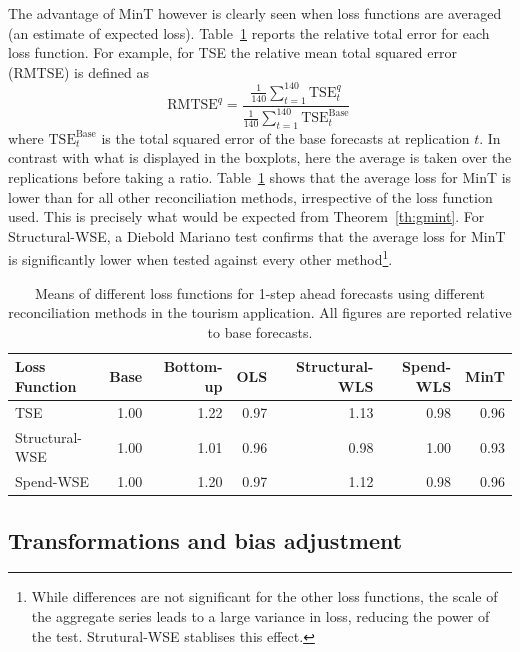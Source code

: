 \documentclass[12pt]{article}
\theoremstyle{definition}
\begin{document}
{\color{blue}

The advantage of MinT however is clearly seen when loss functions are averaged (an estimate of expected loss).  Table~\ref{tab:lossVmethods} reports the relative total error for each loss function. For example, for TSE the relative mean total squared error (RMTSE) is defined as
\begin{equation}
\textrm{RMTSE}^{q}=\frac{\frac{1}{140}\sum\limits_{t=1}^{140}\textrm{TSE}^{q}_t}{\frac{1}{140}\sum\limits_{t=1}^{140}\textrm{TSE}^{\textrm{Base}}_t}\,\label{eq:RTSE}
\end{equation}
where $\textrm{TSE}^{\textrm{Base}}_t$ is the total squared error of the base forecasts at replication $t$.  In contrast with what is displayed in the boxplots, here the average is taken over the replications before taking a ratio.  Table~\ref{tab:lossVmethods} shows that the average loss for MinT is lower than for all other reconciliation methods, irrespective of the loss function used.  This is precisely what would be expected from Theorem~\ref{th:gmint}. For Structural-WSE, a Diebold Mariano test confirms that the average loss for MinT is significantly lower when tested against every other method\footnote{{\color{blue} While differences are not significant for the other loss functions, the scale of the aggregate series leads to a large variance in loss, reducing the power of the test.  Strutural-WSE stablises this effect.}}.


\begin{table}[ht]
	\centering
{\color{blue}	
	\begin{tabular}{lrrrrrr}
		\hline
		Loss Function & Base & Bottom-up & OLS & Structural-WLS & Spend-WLS & MinT \\
		\hline
		TSE & 1.00 & 1.22 & 0.97 & 1.13 & 0.98 & 0.96 \\
		Structural-WSE & 1.00 & 1.01 & 0.96 & 0.98 & 1.00 & 0.93 \\
		Spend-WSE & 1.00 & 1.20 & 0.97 & 1.12 & 0.98 & 0.96 \\
		\hline
    \end{tabular}
}
	\caption{{\color{blue}Means of different loss functions for 1-step ahead forecasts using different reconciliation methods in the tourism application.  All figures are reported relative to base forecasts.}}
	\label{tab:lossVmethods}
\end{table}


\subsection{Transformations and bias adjustment}

}
\end{document}
